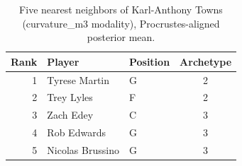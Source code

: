 \begin{table}[htbp]
  \centering\small
  \begin{tabular}{rllc}
    \toprule
    Rank & Player & Position & Archetype \\
    \midrule
    1 & Tyrese Martin & G & 2 \\
    2 & Trey Lyles & F & 2 \\
    3 & Zach Edey & C & 3 \\
    4 & Rob Edwards & G & 3 \\
    5 & Nicolas Brussino & G & 3 \\
    \bottomrule
  \end{tabular}
  \caption{Five nearest neighbors of Karl-Anthony Towns (curvature_m3 modality), Procrustes-aligned posterior mean.}
  \label{tab:Karl_Anthony_Towns_neighbors_curvature_m3}
\end{table}

